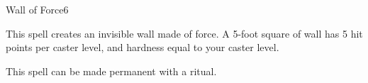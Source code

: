 \begin{spellsection}{Wall of Force}{6}
\begin{spellheader}
    \begin{spelltargetinginfo}
    \end{spelltargetinginfo}
\end{spellheader}
\begin{spellcontent}
    \begin{spelleffects}
        \spelleffect This spell creates an invisible wall made of force. A 5-foot square of wall has 5 hit points per caster level, and hardness equal to your caster level.
        \spelldur \durshort \dismissable
    \end{spelleffects}
\end{spellcontent}
\begin{spellfooter}
    \spellnotes \forcespellnotes

    This spell can be made permanent with a  ritual.
\end{spellfooter}
\end{spellsection}

